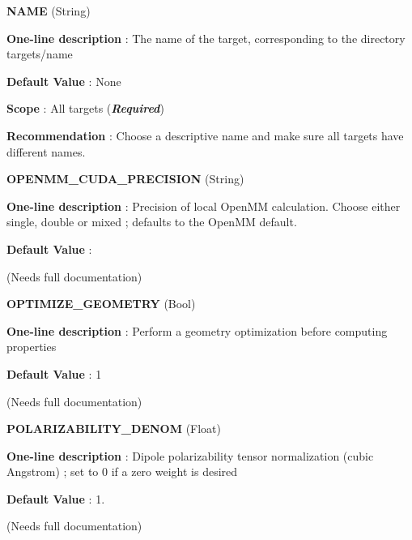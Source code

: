 \begin{DoxyItemize}
\item {\bfseries  N\-A\-M\-E } (String) \par
{\bfseries  One-\/line description }\-: The name of the target, corresponding to the directory targets/name \par
{\bfseries  Default Value }\-: None \par
{\bfseries  Scope }\-: All targets ({\bfseries {\itshape Required}}) \par
{\bfseries  Recommendation }\-: Choose a descriptive name and make sure all targets have different names.\end{DoxyItemize}
\begin{DoxyItemize}
\item {\bfseries  O\-P\-E\-N\-M\-M\-\_\-\-C\-U\-D\-A\-\_\-\-P\-R\-E\-C\-I\-S\-I\-O\-N } (String) \par
{\bfseries  One-\/line description }\-: Precision of local Open\-M\-M calculation. Choose either single, double or mixed ; defaults to the Open\-M\-M default. \par
{\bfseries  Default Value }\-: \par
(Needs full documentation)\end{DoxyItemize}
\begin{DoxyItemize}
\item {\bfseries  O\-P\-T\-I\-M\-I\-Z\-E\-\_\-\-G\-E\-O\-M\-E\-T\-R\-Y } (Bool) \par
{\bfseries  One-\/line description }\-: Perform a geometry optimization before computing properties \par
{\bfseries  Default Value }\-: 1 \par
(Needs full documentation)\end{DoxyItemize}
\begin{DoxyItemize}
\item {\bfseries  P\-O\-L\-A\-R\-I\-Z\-A\-B\-I\-L\-I\-T\-Y\-\_\-\-D\-E\-N\-O\-M } (Float) \par
{\bfseries  One-\/line description }\-: Dipole polarizability tensor normalization (cubic Angstrom) ; set to 0 if a zero weight is desired \par
{\bfseries  Default Value }\-: 1. \par
(Needs full documentation)\end{DoxyItemize}
